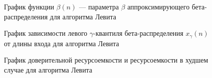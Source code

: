 \begin{figure}[h!]
\caption{График функции $\beta(n)$ — параметра $\beta$ аппроксимирующего бета-распределения для алгоритма Левита}
\label{ris:image1}
\end{figure}
\newpage
\begin{figure}[h!]
\caption{График зависимости левого $\gamma$-квантиля бета-распределения $x_{\gamma}(n)$ от длины входа для алгоритма Левита}
\label{ris:image1}
\end{figure}

\begin{figure}[h!]
\caption{График доверительной ресурсоемкости и ресурсоемкости в худшем случае для алгоритма Левита}
\label{ris:image1}
\end{figure}

